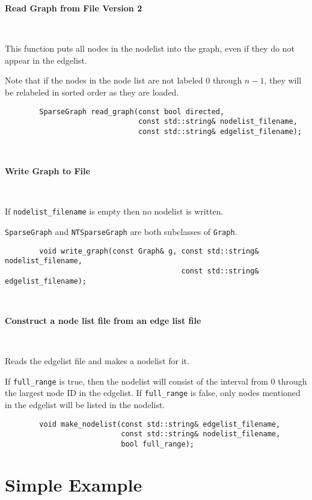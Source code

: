 \documentclass{article}
\begin{document}
\newpage

\textbf{Read Graph from File Version 2}

\ 

This function puts all nodes in the nodelist into the graph, even if they do not appear in the edgelist.

Note that if the nodes in the node list are not labeled 0 through $n-1$, they will be relabeled in sorted order as they are loaded.

\begin{verbatim}
        SparseGraph read_graph(const bool directed,
                               const std::string& nodelist_filename,
                               const std::string& edgelist_filename);
\end{verbatim}

\ 

\textbf{Write Graph to File}

\ 

If \verb|nodelist_filename| is empty then no nodelist is written.

\verb|SparseGraph| and \verb|NTSparseGraph| are both subclasses of \verb|Graph|.

\begin{verbatim}
        void write_graph(const Graph& g, const std::string& nodelist_filename,
                                         const std::string& edgelist_filename);
\end{verbatim}

\ 

\textbf{Construct a node list file from an edge list file}

\ 

Reads the edgelist file and makes a nodelist for it.

If \verb|full_range| is true, then the nodelist will consist of the interval from 0 through the largest node ID in the edgelist. If \verb|full_range| is false, only nodes mentioned in the edgelist will be listed in the nodelist.

\begin{verbatim}
        void make_nodelist(const std::string& edgelist_filename,
                           const std::string& nodelist_filename,
                           bool full_range);
\end{verbatim}

\newpage

\section{Simple Example}\label{sec:full_example}
\end{document}
